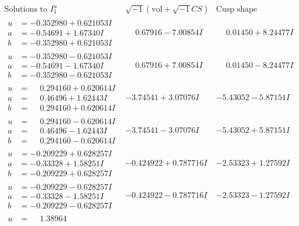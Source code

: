 \documentclass[1p]{elsarticle_modified}
\theoremstyle{definition}
\newcommand{\I}{\sqrt{-1}}
\begin{document}
$$\begin{array}{c|c|c}  
\text{Solutions to }I^u_{1}& \I (\text{vol} + \sqrt{-1}CS) & \text{Cusp shape}\\
 \hline 
\begin{aligned}
u &= -0.352980 + 0.621053 I \\
a &= -0.54691 + 1.67340 I \\
b &= -0.352980 + 0.621053 I\end{aligned}
 & \phantom{-}0.67916 - 7.00854 I & \phantom{-}0.01450 + 8.24477 I \\ \hline\begin{aligned}
u &= -0.352980 - 0.621053 I \\
a &= -0.54691 - 1.67340 I \\
b &= -0.352980 - 0.621053 I\end{aligned}
 & \phantom{-}0.67916 + 7.00854 I & \phantom{-}0.01450 - 8.24477 I \\ \hline\begin{aligned}
u &= \phantom{-}0.294160 + 0.620614 I \\
a &= \phantom{-}0.46496 + 1.62443 I \\
b &= \phantom{-}0.294160 + 0.620614 I\end{aligned}
 & -3.74541 + 3.07076 I & -5.43052 - 5.87151 I \\ \hline\begin{aligned}
u &= \phantom{-}0.294160 - 0.620614 I \\
a &= \phantom{-}0.46496 - 1.62443 I \\
b &= \phantom{-}0.294160 - 0.620614 I\end{aligned}
 & -3.74541 - 3.07076 I & -5.43052 + 5.87151 I \\ \hline\begin{aligned}
u &= -0.209229 + 0.628257 I \\
a &= -0.33328 + 1.58251 I \\
b &= -0.209229 + 0.628257 I\end{aligned}
 & -0.424922 + 0.787716 I & -2.53323 + 1.27592 I \\ \hline\begin{aligned}
u &= -0.209229 - 0.628257 I \\
a &= -0.33328 - 1.58251 I \\
b &= -0.209229 - 0.628257 I\end{aligned}
 & -0.424922 - 0.787716 I & -2.53323 - 1.27592 I \\ \hline\begin{aligned}
u &= \phantom{-}1.38964\phantom{ +0.000000I} \\

\end{aligned}
\end{array}$$
\end{document}
